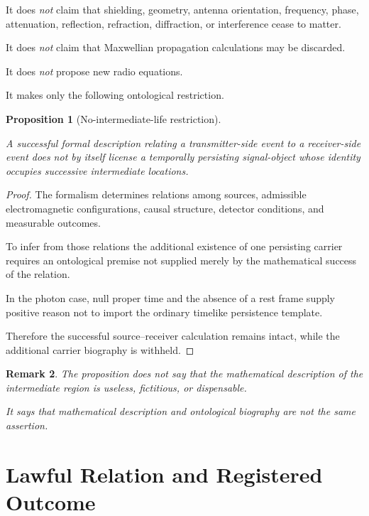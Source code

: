 \documentclass[12pt,onecolumn]{article}
\newtheorem{proposition}{Proposition}[section]
\newtheorem{remark}[proposition]{Remark}
\begin{document}
It does \emph{not} claim that shielding, geometry, antenna orientation,
frequency, phase, attenuation, reflection, refraction, diffraction, or
interference cease to matter.

It does \emph{not} claim that Maxwellian propagation calculations may be
discarded.

It does \emph{not} propose new radio equations.

It makes only the following ontological restriction.

\begin{proposition}[No-intermediate-life restriction]
\label{prop:nointermediatelife}

A successful formal description relating a transmitter-side event to a
receiver-side event does not by itself license a temporally persisting
signal-object whose identity occupies successive intermediate locations.

\end{proposition}

\begin{proof}

The formalism determines relations among sources, admissible
electromagnetic configurations, causal structure, detector conditions,
and measurable outcomes.

To infer from those relations the additional existence of one persisting
carrier requires an ontological premise not supplied merely by the
mathematical success of the relation.

In the photon case, null proper time and the absence of a rest frame
supply positive reason not to import the ordinary timelike persistence
template.

Therefore the successful source--receiver calculation remains intact,
while the additional carrier biography is withheld.

\end{proof}

\begin{remark}

The proposition does not say that the mathematical description of the
intermediate region is useless, fictitious, or dispensable.

It says that mathematical description and ontological biography are not
the same assertion.

\end{remark}

\section{Lawful Relation and Registered Outcome}
\end{document}

